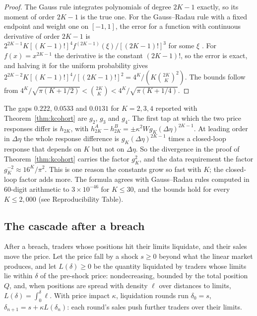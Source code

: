 \documentclass[12pt]{article}
\theoremstyle{definition}
\theoremstyle{remark}
\begin{document}
\begin{proof}
The Gauss rule integrates polynomials of degree $2K-1$ exactly, so its moment of order $2K-1$ is the true one. For the Gauss--Radau rule with a fixed endpoint and weight one on $[-1,1]$, the error for a function with continuous derivative of order $2K-1$ is $2^{2K-1}K[(K-1)!]^4f^{(2K-1)}(\xi)/[(2K-1)!]^3$ for some $\xi$ \citep[25.4.31]{abramowitz1964}. For $f(x)=x^{2K-1}$ the derivative is the constant $(2K-1)!$, so the error is exact, and halving it for the uniform probability gives $2^{2K-2}K[(K-1)!]^4/[(2K-1)!]^2=4^K/(K\binom{2K}{K}^2)$. The bounds follow from $4^K/\sqrt{\pi(K+1/2)}<\binom{2K}{K}<4^K/\sqrt{\pi(K+1/4)}$.
\end{proof}

The gaps $0.222$, $0.0533$ and $0.0131$ for $K=2,3,4$ reported with Theorem~\ref{thm:kcohort} are $g_2$, $g_3$ and $g_4$. The first tap at which the two price responses differ is $h_{2K}$, with $h^A_{2K}-h^B_{2K}=\pm\kappa^2Wg_K(\Delta\eta)^{2K-1}$. At leading order in $\Delta\eta$ the whole response difference is $g_K(\Delta\eta)^{2K-1}$ times a closed-loop response that depends on $K$ but not on $\Delta\eta$. So the divergence in the proof of Theorem~\ref{thm:kcohort} carries the factor $g_K^2$, and the data requirement the factor $g_K^{-2}\approx16^K/\pi^2$. This is one reason the constants grow so fast with $K$; the closed-loop factor adds more. The formula agrees with Gauss--Radau rules computed in 60-digit arithmetic to $3\times10^{-46}$ for $K\le30$, and the bounds hold for every $K\le2{,}000$ (see Reproducibility Table).

\subsection{The cascade after a breach}

After a breach, traders whose positions hit their limits liquidate, and their sales move the price. Let the price fall by a shock $s\ge0$ beyond what the linear market produces, and let $L(\delta)\ge0$ be the quantity liquidated by traders whose limits lie within $\delta$ of the pre-shock price: nondecreasing, bounded by the total position $Q$, and, when positions are spread with density $\ell$ over distances to limits, $L(\delta)=\int_0^\delta\ell$. With price impact $\kappa$, liquidation rounds run $\delta_0=s$, $\delta_{n+1}=s+\kappa L(\delta_n)$: each round's sales push further traders over their limits.
\end{document}
